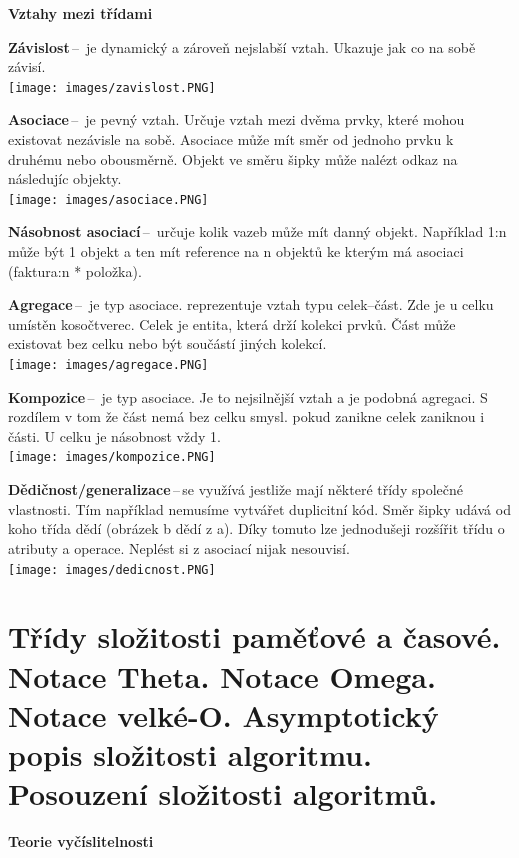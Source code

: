 \begin{Large}\vspace{0,5cm} \textbf{Vztahy mezi třídami}
\end{Large}

\textbf{Závislost}\,--\, je dynamický a zároveň nejslabší vztah. Ukazuje jak co na sobě závisí.\\
\texttt{[image: images/zavislost.PNG]}

\textbf{Asociace}\,--\, je pevný vztah. Určuje vztah mezi dvěma prvky, které mohou existovat nezávisle na sobě. Asociace může mít směr od jednoho prvku k druhému nebo obousměrně. Objekt ve směru šipky může nalézt odkaz na následujíc objekty. \\
\texttt{[image: images/asociace.PNG]}

\textbf{Násobnost asociací}\,--\, určuje kolik vazeb může mít danný objekt. Například 1:n může být 1 objekt a ten mít reference na n objektů ke kterým má asociaci (faktura:n * položka).

\textbf{Agregace}\,--\, je typ asociace. reprezentuje vztah typu celek--část. Zde je u celku umístěn kosočtverec. Celek je entita, která drží kolekci prvků. Část může existovat bez celku nebo být součástí jiných kolekcí. \\\texttt{[image: images/agregace.PNG]}

\textbf{Kompozice}\,--\, je typ asociace. Je to nejsilnější vztah a je podobná agregaci. S rozdílem v tom že část nemá bez celku smysl. pokud zanikne celek zaniknou i části. U celku je násobnost vždy 1.\\ \texttt{[image: images/kompozice.PNG]}

\textbf{Dědičnost/generalizace}\,--\,se využívá jestliže mají některé třídy společné vlastnosti. Tím například nemusíme vytvářet duplicitní kód. Směr šipky udává od koho třída dědí (obrázek b dědí z a). Díky tomuto lze jednodušeji rozšířit třídu o atributy a operace. Neplést si z asociací nijak nesouvisí.\\
\texttt{[image: images/dedicnost.PNG]}





\newpage
\section{Třídy složitosti paměťové a časové. Notace Theta. Notace Omega. Notace velké-O. Asymptotický popis složitosti algoritmu. Posouzení složitosti algoritmů.}
\begin{Large}\vspace{0,5cm} \textbf{Teorie vyčíslitelnosti}
\end{Large}

